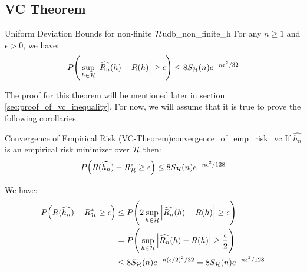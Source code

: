 \subsection{VC Theorem}
\begin{theorem}{Uniform Deviation Bounds for non-finite $\mathcal{H}$}{udb_non_finite_h}
    For any $n\ge1$ and $\epsilon>0$, we have:
    \begin{align*}
        P\Bigg( 
            \sup_{h\in\mathcal{H}} \Big| 
                \widehat{R_n}(h) - R(h)
             \Big| \ge \epsilon
         \Bigg) \le 8S_{\mathcal{H}}(n) e^{-n\epsilon^2/32}
    \end{align*}
\end{theorem}

\begin{proof*}
    The proof for this theorem will be mentioned later in section \ref{sec:proof_of_vc_inequality}. For now, we will assume that it is true to prove the following corollaries.
\end{proof*}

\begin{corollary}{Convergence of Empirical Risk (VC-Theorem)}{convergence_of_emp_risk_vc}
    If $\widehat{h_n}$ is an empirical risk minimizer over $\mathcal{H}$ then:
    \begin{align*}
        P\Big( 
            R(\widehat{h_n}) - R_{\mathcal{H}}^* \ge \epsilon
         \Big) \le 8S_{\mathcal{H}}(n)e^{-n\epsilon^2/128}
    \end{align*}
\end{corollary}

\begin{proof*}
    We have:
    \begin{align*}
        P\Big( 
            R(\widehat{h_n}) - R_{\mathcal{H}}^* \ge \epsilon
         \Big) 
        &\le 
        P\Bigg( 
            2\sup_{h\in\mathcal{H}} \Big| \widehat{R_n}(h) - R(h) \Big| \ge \epsilon
         \Bigg) \\
        &= 
        P\Bigg( 
            \sup_{h\in\mathcal{H}} \Big| \widehat{R_n}(h) - R(h) \Big| \ge \frac{\epsilon}{2}
         \Bigg) \\
        &\le 8S_{\mathcal{H}}(n)e^{-n(\epsilon/2)^2/32} = 8S_{\mathcal{H}}(n)e^{-n\epsilon^2/128}
    \end{align*}
\end{proof*}


